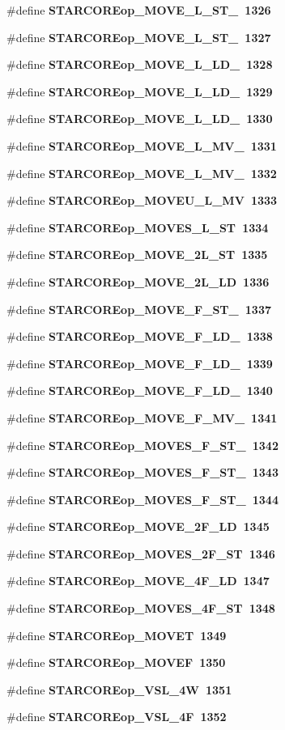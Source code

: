 \begin{CompactItemize}
\#define \bf{STARCOREop\_\-MOVE\_\-L\_\-ST\_}~1326
\item 
\#define \bf{STARCOREop\_\-MOVE\_\-L\_\-ST\_}~1327
\item 
\#define \bf{STARCOREop\_\-MOVE\_\-L\_\-LD\_}~1328
\item 
\#define \bf{STARCOREop\_\-MOVE\_\-L\_\-LD\_}~1329
\item 
\#define \bf{STARCOREop\_\-MOVE\_\-L\_\-LD\_}~1330
\item 
\#define \bf{STARCOREop\_\-MOVE\_\-L\_\-MV\_}~1331
\item 
\#define \bf{STARCOREop\_\-MOVE\_\-L\_\-MV\_}~1332
\item 
\#define \bf{STARCOREop\_\-MOVEU\_\-L\_\-MV}~1333
\item 
\#define \bf{STARCOREop\_\-MOVES\_\-L\_\-ST}~1334
\item 
\#define \bf{STARCOREop\_\-MOVE\_\-2L\_\-ST}~1335
\item 
\#define \bf{STARCOREop\_\-MOVE\_\-2L\_\-LD}~1336
\item 
\#define \bf{STARCOREop\_\-MOVE\_\-F\_\-ST\_}~1337
\item 
\#define \bf{STARCOREop\_\-MOVE\_\-F\_\-LD\_}~1338
\item 
\#define \bf{STARCOREop\_\-MOVE\_\-F\_\-LD\_}~1339
\item 
\#define \bf{STARCOREop\_\-MOVE\_\-F\_\-LD\_}~1340
\item 
\#define \bf{STARCOREop\_\-MOVE\_\-F\_\-MV\_}~1341
\item 
\#define \bf{STARCOREop\_\-MOVES\_\-F\_\-ST\_}~1342
\item 
\#define \bf{STARCOREop\_\-MOVES\_\-F\_\-ST\_}~1343
\item 
\#define \bf{STARCOREop\_\-MOVES\_\-F\_\-ST\_}~1344
\item 
\#define \bf{STARCOREop\_\-MOVE\_\-2F\_\-LD}~1345
\item 
\#define \bf{STARCOREop\_\-MOVES\_\-2F\_\-ST}~1346
\item 
\#define \bf{STARCOREop\_\-MOVE\_\-4F\_\-LD}~1347
\item 
\#define \bf{STARCOREop\_\-MOVES\_\-4F\_\-ST}~1348
\item 
\#define \bf{STARCOREop\_\-MOVET}~1349
\item 
\#define \bf{STARCOREop\_\-MOVEF}~1350
\item 
\#define \bf{STARCOREop\_\-VSL\_\-4W}~1351
\item 
\#define \bf{STARCOREop\_\-VSL\_\-4F}~1352

\end{CompactItemize}
